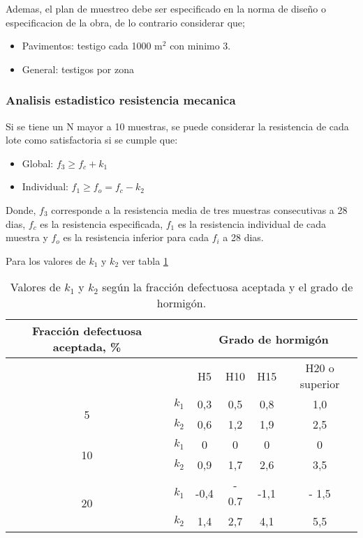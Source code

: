 Ademas, el plan de muestreo debe ser especificado en la norma de diseño o especificacion de la obra, de lo contrario considerar que;

\begin{itemize}
    \item Pavimentos: testigo cada 1000 m$^2$ con minimo 3.
    \item General: testigos por zona
\end{itemize}

\subsubsection{Analisis estadistico resistencia mecanica}

Si se tiene un N mayor a 10 muestras, se puede considerar la resistencia de cada lote como satisfactoria si se cumple que:

\begin{itemize}
    \item Global: $f_3 \geq f_c + k_1$
    \item Individual: $f_1 \geq f_o = f_c - k_2$
\end{itemize}

Donde, $f_3$ corresponde a la resistencia media de tres muestras consecutivas a 28 dias, $f_c$ es la resistencia especificada, $f_1$ es la resistencia individual de cada muestra y $f_o$ es la resistencia inferior para cada $f_i$ a 28 dias.

Para los valores de $k_1$ y $k_2$ ver tabla \ref{tab:valoresk}

\begin{table}[H]
\centering
\begin{tabular}{|c|c|c|c|c|c|}
\hline
\textbf{Fracción defectuosa aceptada, \%} &  & \multicolumn{4}{c|}{\textbf{Grado de hormigón}} \\ \hline
 &  & H5 & H10 & H15 & H20 o superior \\ \hline
\multirow{2}{*}{5}  & $k_{1}$ & 0,3 & 0,5 & 0,8 & 1,0 \\ \cline{2-6}
                    & $k_{2}$ & 0,6 & 1,2 & 1,9 & 2,5 \\ \hline
\multirow{2}{*}{10} & $k_{1}$ & 0   & 0   & 0   & 0   \\ \cline{2-6}
                    & $k_{2}$ & 0,9 & 1,7 & 2,6 & 3,5 \\ \hline
\multirow{2}{*}{20} & $k_{1}$ & -0,4 & - 0.7   & -1,1 & - 1,5 \\ \cline{2-6}
                    & $k_{2}$ & 1,4 & 2,7 & 4,1 & 5,5 \\ \hline
\end{tabular}
\caption{Valores de $k_{1}$ y $k_{2}$ según la fracción defectuosa aceptada y el grado de hormigón.}
\label{tab:valoresk}
\end{table}

